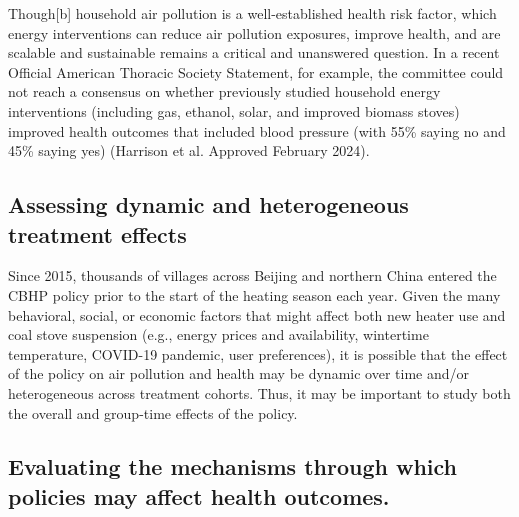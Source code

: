 \documentclass[
  letterpaper,
  DIV=11,
  numbers=noendperiod]{scrartcl}
\begin{document}
Though{[}b{]} household air pollution is a well-established health risk
factor, which energy interventions can reduce air pollution exposures,
improve health, and are scalable and sustainable remains a critical and
unanswered question. In a recent Official American Thoracic Society
Statement, for example, the committee could not reach a consensus on
whether previously studied household energy interventions (including
gas, ethanol, solar, and improved biomass stoves) improved health
outcomes that included blood pressure (with 55\% saying no and 45\%
saying yes) (Harrison et al. Approved February 2024).

\hypertarget{assessing-dynamic-and-heterogeneous-treatment-effects}{%
\subsection{Assessing dynamic and heterogeneous treatment
effects}\label{assessing-dynamic-and-heterogeneous-treatment-effects}}

Since 2015, thousands of villages across Beijing and northern China
entered the CBHP policy prior to the start of the heating season each
year. Given the many behavioral, social, or economic factors that might
affect both new heater use and coal stove suspension (e.g., energy
prices and availability, wintertime temperature, COVID-19 pandemic, user
preferences), it is possible that the effect of the policy on air
pollution and health may be dynamic over time and/or heterogeneous
across treatment cohorts. Thus, it may be important to study both the
overall and group-time effects of the policy.

\hypertarget{evaluating-the-mechanisms-through-which-policies-may-affect-health-outcomes.}{%
\subsection{Evaluating the mechanisms through which policies may affect
health
outcomes.}\label{evaluating-the-mechanisms-through-which-policies-may-affect-health-outcomes.}}
\end{document}
